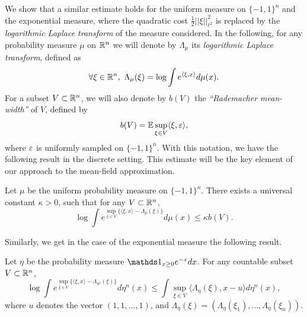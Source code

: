 \documentclass[a4paper,oneside,11pt]{article}
\begin{document}
We show that a similar estimate holds for the uniform measure on $\{-1,1\}^n$ and the exponential measure, where the quadratic cost $\frac{1}{2} ||\xi||_{\ell^2}^2$ is replaced by the \textit{logarithmic Laplace transform} of the measure considered.
In the following, for any probability measure $\mu$ on $\mathbb{R}^n$ we will denote by $\Lambda_\mu$  its \textit{logarithmic Laplace transform}, defined as
$$ \forall \xi \in \mathbb{R}^n , \ \Lambda_{\mu}(\xi) = \log \int e^{\langle \xi, x \rangle} d\mu(x).$$
For a subset $V \subset \mathbb{R}^n$, we will also denote by $b(V)$ the \textit{``Rademacher mean-width''} of $V$, defined by
\begin{equation} \label{Rademwidth} b(V) = \mathbb{E} \sup_{\xi \in V} \langle \xi, \varepsilon \rangle,\end{equation}
where $\varepsilon$ is uniformly sampled on $\{-1,1\}^n$. With this notation, we have the following result in the discrete setting. This estimate will be the key element of our approach to the mean-field approximation.
\begin{Pro}\label{strongintB}
Let $\mu$ be the uniform probability measure on $\{-1,1\}^n$. There exists a universal constant $\kappa >0$, such that for any $V \subset \mathbb{R}^n$, 
$$ \log \int e^{\sup_{\xi \in V}\{ \langle \xi, x \rangle - \Lambda_{\mu}(\xi) \}}d\mu(x) \leq \kappa b(V).$$
\end{Pro}
Similarly, we get in the case of the exponential measure the following result. 
\begin{Pro}\label{intexpo}
Let $\eta$ be the probability measure $\Car_{x\geq 0} e^{-x} dx$. For any countable subset $V \subset \mathbb{R}^n$, 
$$ \log \int e^{\sup_{\xi \in V} \{ \langle \xi, x\rangle - \Lambda_{\eta^n}(\xi) \}}d\eta^n(x) \leq \int \sup_{\xi \in V} \langle\Lambda_\eta(\xi), x-u\rangle d\eta^n(x),$$
where $u$ denotes the vector $(1,1,\ldots,1)$, and $\Lambda_\eta(\xi ) =(\Lambda_\eta(\xi_1),\ldots,\Lambda_\eta(\xi_n))$.
\end{Pro}
\end{document}
